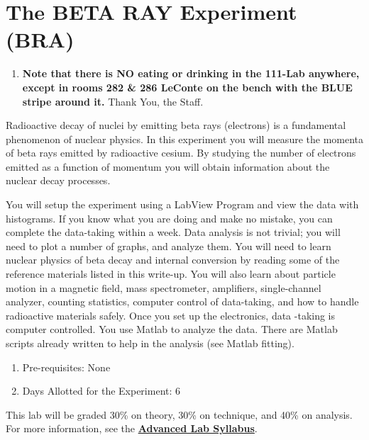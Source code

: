 \documentclass{../lab}
\begin{document}
\maketitle

\tableofcontents

\section{The BETA RAY Experiment (BRA)}

\begin{enumerate}
    \item \textbf{Note that there is NO eating or drinking in the 111-Lab anywhere, except in rooms 282 \& 286 LeConte on the bench with the BLUE stripe around it.} Thank You, the Staff.
\end{enumerate}

Radioactive decay of nuclei by emitting beta rays (electrons) is a fundamental phenomenon of nuclear physics. In this experiment you will measure the momenta of beta rays emitted by radioactive cesium. By studying the number of electrons emitted as a function of momentum you will obtain information about the nuclear decay processes.

You will setup the experiment using a LabView Program and view the data with histograms. If you know what you are doing and make no mistake, you can complete the data-taking within a week. Data analysis is not trivial; you will need to plot a number of graphs, and analyze them. You will need to learn nuclear physics of beta decay and internal conversion by reading some of the reference materials listed in this write-up. You will also learn about particle motion in a magnetic field, mass spectrometer, amplifiers, single-channel analyzer, counting statistics, computer control of data-taking, and how to handle radioactive materials safely. Once you set up the electronics, data -taking is computer controlled. You use Matlab to analyze the data. There are Matlab scripts already written to help in the analysis (see Matlab fitting).

\begin{enumerate}
    \item Pre-requisites: None

    \item Days Allotted for the Experiment: 6

\end{enumerate}

This lab will be graded 30\% on theory, 30\% on technique, and 40\% on analysis. For more information, see the \href{\AdvancedLabSyllabus}{\textbf{Advanced Lab Syllabus}}.
\end{document}
